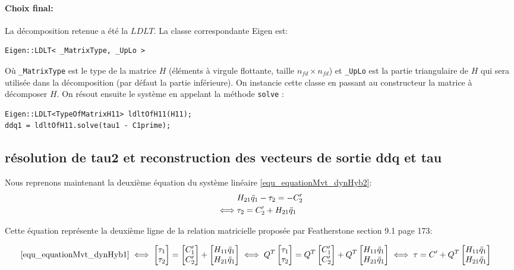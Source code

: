 \documentclass{report}
\begin{document}
\paragraph{Choix final:} La décomposition retenue a été la $LDLT$. La classe correspondante Eigen est:
\begin{verbatim}
Eigen::LDLT< _MatrixType, _UpLo >
\end{verbatim}
Où \verb;_MatrixType; est le type de la matrice $H$ (éléments à virgule flottante, taille $n_{fd} \times n_{fd}$) et \verb;_UpLo; est la partie triangulaire de $H$ qui sera utilisée dans la décomposition (par défaut la partie inférieure). On instancie cette classe en passant au constructeur la matrice à décomposer $H$. On résout ensuite le système en appelant la méthode \verb;solve; :
\begin{verbatim}
Eigen::LDLT<TypeOfMatrixH11> ldltOfH11(H11);
ddq1 = ldltOfH11.solve(tau1 - C1prime);
\end{verbatim}


\subsection{résolution de tau2 et reconstruction des vecteurs de sortie ddq et tau}

Nous reprenons maintenant la deuxième équation du système linéaire \eqref{equ_equationMvt_dynHyb2}:
\begin{align}
&H_{21} \ddot{q}_1 - \tau_2 = -C'_2 \notag \\
\iff
&\tau_2 = C'_2 + H_{21} \ddot{q}_1 \label{equ_tau}
\end{align}

Cette équation représente la deuxième ligne de la relation matricielle proposée par Featherstone \cite{bib_featherstone} section 9.1 page 173:

\begin{align}
\eqref{equ_equationMvt_dynHyb1}
&\iff
\begin{bmatrix}
\tau_1 \\ 
\tau_2
\end{bmatrix} 
=
\begin{bmatrix}
C'_1 \\ 
C'_2
\end{bmatrix} 
+
\begin{bmatrix}
H_{11} \ddot{q}_1 \\ 
H_{21} \ddot{q}_1
\end{bmatrix} \iff
Q^T
\begin{bmatrix}
\tau_1 \\ 
\tau_2
\end{bmatrix} 
=
Q^T
\begin{bmatrix}
C'_1 \\ 
C'_2
\end{bmatrix} 
+
Q^T
\begin{bmatrix}
H_{11} \ddot{q}_1 \\ 
H_{21} \ddot{q}_1
\end{bmatrix} \iff \tau = C'
+
Q^T
\begin{bmatrix}
H_{11} \ddot{q}_1 \\ 
H_{21} \ddot{q}_1
\end{bmatrix}
\end{align}
\end{document}
